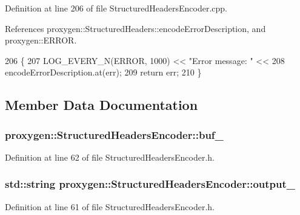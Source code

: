 Definition at line 206 of file Structured\+Headers\+Encoder.\+cpp.



References proxygen\+::\+Structured\+Headers\+::encode\+Error\+Description, and proxygen\+::\+E\+R\+R\+OR.


\begin{DoxyCode}
206                                                                        \{
207   LOG\_EVERY\_N(ERROR, 1000) << \textcolor{stringliteral}{"Error message: "} <<
208     encodeErrorDescription.at(err);
209   \textcolor{keywordflow}{return} err;
210 \}
\end{DoxyCode}


\subsection{Member Data Documentation}
\subsubsection[{buf\+\_\+}]{ proxygen\+::\+Structured\+Headers\+Encoder\+::buf\+\_\+\hspace{0.3cm}{\ttfamily [private]}}\label{classproxygen_1_1StructuredHeadersEncoder_a54a9d179ad13f459b21930829fc8dde7}


Definition at line 62 of file Structured\+Headers\+Encoder.\+h.

\subsubsection[{output\+\_\+}]{\setlength{\rightskip}{0pt plus 5cm}std\+::string proxygen\+::\+Structured\+Headers\+Encoder\+::output\+\_\+\hspace{0.3cm}{\ttfamily [private]}}\label{classproxygen_1_1StructuredHeadersEncoder_a99e2a3bec82498f8429d2de9ddea3365}


Definition at line 61 of file Structured\+Headers\+Encoder.\+h.



